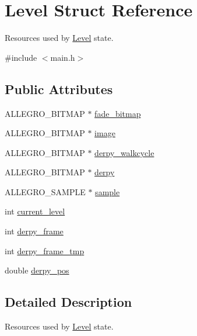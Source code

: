 \hypertarget{structLevel}{\section{\-Level \-Struct \-Reference}
\label{structLevel}
}


\-Resources used by \hyperlink{structLevel}{\-Level} state.  




{\ttfamily \#include $<$main.\-h$>$}

\subsection*{\-Public \-Attributes}
\begin{DoxyCompactItemize}
\item 
\-A\-L\-L\-E\-G\-R\-O\-\_\-\-B\-I\-T\-M\-A\-P $\ast$ \hyperlink{structLevel_a1a9629222f6536790772ad7af5d2413c}{fade\-\_\-bitmap}
\item 
\-A\-L\-L\-E\-G\-R\-O\-\_\-\-B\-I\-T\-M\-A\-P $\ast$ \hyperlink{structLevel_a29a3fe4b6d80ae62843840aa6afa0596}{image}
\item 
\-A\-L\-L\-E\-G\-R\-O\-\_\-\-B\-I\-T\-M\-A\-P $\ast$ \hyperlink{structLevel_ab6a78c50cda8424f722ca249f5466f67}{derpy\-\_\-walkcycle}
\item 
\-A\-L\-L\-E\-G\-R\-O\-\_\-\-B\-I\-T\-M\-A\-P $\ast$ \hyperlink{structLevel_ae33832497116b7a0c184959bbde21ee5}{derpy}
\item 
\-A\-L\-L\-E\-G\-R\-O\-\_\-\-S\-A\-M\-P\-L\-E $\ast$ \hyperlink{structLevel_a234fa7b9ec35dd360e4e3c48a944fc7d}{sample}
\item 
int \hyperlink{structLevel_a1ba3ee0104c912dde5d6e70fee889512}{current\-\_\-level}
\item 
int \hyperlink{structLevel_aab3e7d9746c741ce8e1a76df13be7c53}{derpy\-\_\-frame}
\item 
int \hyperlink{structLevel_aa6a30e7b31e2300936f8e97890e1817c}{derpy\-\_\-frame\-\_\-tmp}
\item 
double \hyperlink{structLevel_a2bc3affc5c71ac8f6b9b775cefac0444}{derpy\-\_\-pos}
\end{DoxyCompactItemize}


\subsection{\-Detailed \-Description}
\-Resources used by \hyperlink{structLevel}{\-Level} state. 

